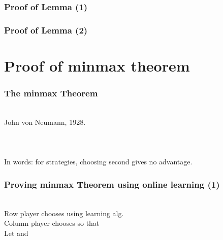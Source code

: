 \documentclass[handout]{beamer}
\begin{document}
\begin{frame}
\frametitle{Proof of Lemma (1)}
\end{frame}


\begin{frame}
\frametitle{Proof of Lemma (2)}
\end{frame}


\section{Proof of minmax theorem}

\begin{frame}
\frametitle{The minmax Theorem}
~\\
John von Neumann, 1928.
\\ ~ \\ \pause
\R{\[ \minp \maxq \mpq = \maxq \minp \mpq \]}
\\ ~ \\ \pause
In words: for  strategies, choosing second gives no advantage.
\end{frame}

\begin{frame}
\frametitle{Proving minmax Theorem using online learning (1)}
~\\
Row player chooses  using learning alg. \\ \pause 
Column player chooses   so that
\R{$\Qt = \arg \maxq \mptq$}
\\ \pause
Let  and
\\ \pause
\R{\em
\[
\begin{array}{rcll}
{\displaystyle{\minp \maxq \trans{\P}\M\Q}} 
 &\leq&
\displaystyle{\maxq \trans{\Pa}\M\Q} & \nextline
\pause
  &=&
\displaystyle{\maxq \frac{1}{T} \sumt \trans{\Pt}\M\Q}
                       &\mbox{\rm by definition of~~\Pa}\nextline
\pause
  &\leq&
\displaystyle{\frac{1}{T} \sumt \maxq \trans{\Pt}\M\Q} &
\end{array}
\]
}
\end{frame}
\end{document}
